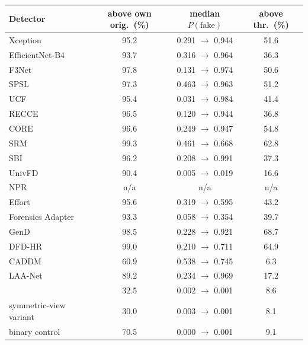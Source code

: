 \begin{tabular}{@{}l ccc@{}}
\toprule
Detector & above own orig.\ (\%) & median $P(\text{fake})$ & above thr.\ (\%) \\
\midrule
Xception & 95.2 & 0.291 $\rightarrow$ 0.944 & 51.6 \\
EfficientNet-B4 & 93.7 & 0.316 $\rightarrow$ 0.964 & 36.3 \\
F3Net & 97.8 & 0.131 $\rightarrow$ 0.974 & 50.6 \\
SPSL & 97.3 & 0.463 $\rightarrow$ 0.963 & 51.2 \\
UCF & 95.4 & 0.031 $\rightarrow$ 0.984 & 41.4 \\
RECCE & 96.5 & 0.120 $\rightarrow$ 0.944 & 36.8 \\
CORE & 96.6 & 0.249 $\rightarrow$ 0.947 & 54.8 \\
SRM & 99.3 & 0.461 $\rightarrow$ 0.668 & 62.8 \\
SBI~\cite{sbi} & 96.2 & 0.208 $\rightarrow$ 0.991 & 37.3 \\
UnivFD & 90.4 & 0.005 $\rightarrow$ 0.019 & 16.6 \\
NPR & n/a & n/a & n/a \\
Effort~\cite{effort} & 95.6 & 0.319 $\rightarrow$ 0.595 & 43.2 \\
Forensics Adapter~\cite{forensicsadapter} & 93.3 & 0.058 $\rightarrow$ 0.354 & 39.7 \\
GenD~\cite{gend2026} & 98.5 & 0.228 $\rightarrow$ 0.921 & 68.7 \\
DFD-HR~\cite{dfdhr2026} & 99.0 & 0.210 $\rightarrow$ 0.711 & 64.9 \\
CADDM~\cite{caddm} & 60.9 & 0.538 $\rightarrow$ 0.745 & 6.3 \\
LAA-Net~\cite{laanet} & 89.2 & 0.234 $\rightarrow$ 0.969 & 17.2 \\
\midrule
\ours{} & 32.5 & 0.002 $\rightarrow$ 0.001 & 8.6 \\
\quad symmetric-view variant & 30.0 & 0.003 $\rightarrow$ 0.001 & 8.1 \\
binary control & 70.5 & 0.000 $\rightarrow$ 0.001 & 9.1 \\
\bottomrule
\end{tabular}
